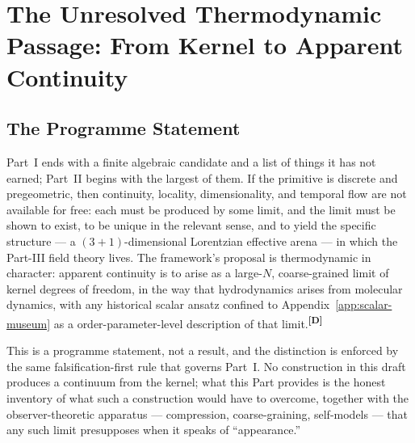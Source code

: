 \documentclass[12pt,a4paper,twoside]{article}
\theoremstyle{plain}
\theoremstyle{definition}
\theoremstyle{remark}
\newcommand{\catmark}[1]{\textsuperscript{\textsf{\textbf{[#1]}}}}
\begin{document}


\section{The Unresolved Thermodynamic Passage: From Kernel to Apparent Continuity}
\label{sec:thermo-passage}

\subsection{The Programme Statement}
\label{subsec:thermo-programme}

Part~I ends with a finite algebraic candidate and a list of things it has
not earned; Part~II begins with the largest of them. If the primitive is
discrete and pregeometric, then continuity, locality, dimensionality, and
temporal flow are not available for free: each must be produced by some
limit, and the limit must be shown to exist, to be unique in the relevant
sense, and to yield the specific structure --- a $(3{+}1)$-dimensional
Lorentzian effective arena --- in which the Part-III field theory lives.
The framework's proposal is thermodynamic in character: apparent
continuity is to arise as a large-$N$, coarse-grained limit of kernel
degrees of freedom, in the way that hydrodynamics arises from molecular
dynamics, with any historical scalar ansatz confined to Appendix~\ref{app:scalar-museum} as a
order-parameter-level description of that limit.\catmark{D}

This is a programme statement, not a result, and the distinction is
enforced by the same falsification-first rule that governs Part~I. No
construction in this draft produces a continuum from the kernel; what
this Part provides is the honest inventory of what such a construction
would have to overcome, together with the observer-theoretic apparatus
--- compression, coarse-graining, self-models --- that any such limit
presupposes when it speaks of ``appearance.''
\end{document}
